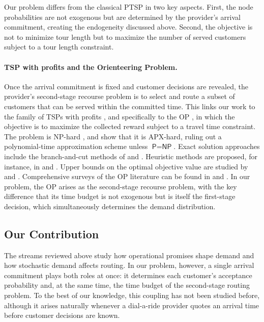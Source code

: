 \documentclass[11pt]{article}
\theoremstyle{plain}
\theoremstyle{definition}
\begin{document}
	Our problem differs from the classical \ac{PTSP} in two key aspects. First, the node probabilities are not exogenous but are determined by the provider's arrival commitment, creating the endogeneity discussed above. Second, the objective is not to minimize tour length but to maximize the number of served customers subject to a tour length constraint.
	
	\paragraph{TSP with profits and the Orienteering Problem.}
	Once the arrival commitment is fixed and customer decisions are revealed, the provider's second-stage recourse problem is to select and route a subset of customers that can be served within the committed time. This links our work to the family of \acp{TSP} with profits \citep{feillet2005traveling}, and specifically to the \ac{OP} \citep{tsiligirides1984heuristic}, in which the objective is to maximize the collected reward subject to a travel time constraint. The problem is NP-hard \citep{golden1987orienteering}, and \cite{blum2007approximation} show that it is APX-hard, ruling out a polynomial-time approximation scheme unless $\textsf{P} = \textsf{NP}$. Exact solution approaches include the branch-and-cut methods of \cite{fischetti1998solving} and \cite{kobeaga2024revisited}. Heuristic methods are proposed, for instance, in \cite{golden1987orienteering} and \cite{kobeaga2018efficient}. Upper bounds on the optimal objective value are studied by \cite{leifer1994strong} and \cite{millar1997time}. Comprehensive surveys of the \ac{OP} literature can be found in \cite{vansteenwegen2011orienteering} and \cite{gunawan2016orienteering}. In our problem, the \ac{OP} arises as the second-stage recourse problem, with the key difference that its time budget is not exogenous but is itself the first-stage decision, which simultaneously determines the demand distribution.
	
	
	\subsection{Our Contribution}
	
	The streams reviewed above study how operational promises shape demand and how stochastic demand affects routing. In our problem, however, a single arrival commitment plays both roles at once: it determines each customer's acceptance probability and, at the same time, the time budget of the second-stage routing problem. To the best of our knowledge, this coupling has not been studied before, although it arises naturally whenever a dial-a-ride provider quotes an arrival time before customer decisions are known.
	
\end{document}
